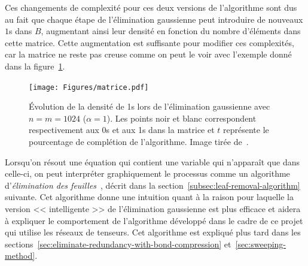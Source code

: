 Ces changements de complexité pour ces deux versions de l'algorithme sont dus au fait que chaque étape de l'élimination gaussienne peut introduire de nouveaux $1$s dans $B$, augmentant ainsi leur densité en fonction du nombre d'éléments dans cette matrice.
Cette augmentation est suffisante pour modifier ces complexités, car la matrice ne reste pas creuse comme on peut le voir avec l'exemple donné dans la figure~\ref{fig:GE-ones-density}.
\begin{figure}[h]
    \centering
    \texttt{[image: Figures/matrice.pdf]}
    \caption[Évolution de la densité de 1s lors de l'élimination gaussienne avec $n = m = 1024$ ($\alpha = 1$). Les points noir et blanc correspondent respectivement aux 0s et aux 1s dans la matrice et $t$ représente le taux de complétion de l'algorithme.]{Évolution de la densité de 1s lors de l'élimination gaussienne avec $n = m = 1024$ ($\alpha = 1$). Les points noir et blanc correspondent respectivement aux 0s et aux 1s dans la matrice et $t$ représente le pourcentage de complétion de l'algorithme. Image tirée de~\protect\cite{braunstein_complexity_2002}.}
    \label{fig:GE-ones-density}
\end{figure}


Lorsqu'on résout une équation qui contient une variable qui n'apparaît que dans celle-ci, on peut interpréter graphiquement le processus comme un algorithme d'\emph{élimination des feuilles}~\cite{mezard_alternative_2002}, décrit dans la section~\ref{subsec:leaf-removal-algorithm} suivante.
Cet algorithme donne une intuition quant à la raison pour laquelle la version << intelligente >> de l'élimination gaussienne est plus efficace et aidera à expliquer le comportement de l'algorithme développé dans le cadre de ce projet qui utilise les réseaux de tenseurs.
Cet algorithme est expliqué plus tard dans les sections~\ref{sec:eliminate-redundancy-with-bond-compression} et~\ref{sec:sweeping-method}.

